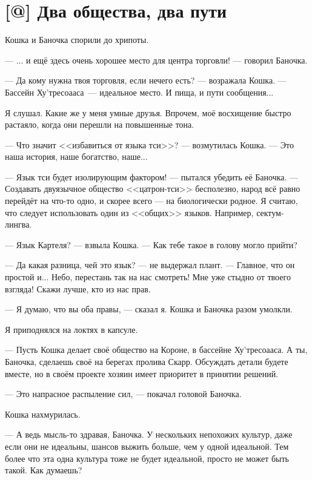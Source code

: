\section{[@] Два общества, два пути}

\textspace

Кошка и Баночка спорили до хрипоты.

--- ... и ещё здесь очень хорошее место для центра торговли! --- говорил Баночка.

--- Да кому нужна твоя торговля, если нечего есть? --- возражала Кошка.
--- Бассейн Ху'тресоааса\FM\ --- идеальное место.
И пища, и пути сообщения...

Я слушал.
Какие же у меня умные друзья.
Впрочем, моё восхищение быстро растаяло, когда они перешли на повышенные тона.

--- Что значит <<избавиться от языка тси>>? --- возмутилась Кошка.
--- Это наша история, наше богатство, наше...

--- Язык тси будет изолирующим фактором! --- пытался убедить её Баночка.
--- Создавать двуязычное общество <<цатрон-тси>> бесполезно, народ всё равно перейдёт на что-то одно, и скорее всего --- на биологически родное.
Я считаю, что следует использовать один из <<общих>> языков.
Например, сектум-лингва.

--- Язык Картеля? --- взвыла Кошка.
--- Как тебе такое в голову могло прийти?

--- Да какая разница, чей это язык? --- не выдержал плант.
--- Главное, что он простой и...
Небо, перестань так на нас смотреть!
Мне уже стыдно от твоего взгляда!
Скажи лучше, кто из нас прав.

--- Я думаю, что вы оба правы, --- сказал я.
Кошка и Баночка разом умолкли.

Я приподнялся на локтях в капсуле.

--- Пусть Кошка делает своё общество на Короне, в бассейне Ху'тресоааса.
А ты, Баночка, сделаешь своё на берегах пролива Скарр.
Обсуждать детали будете вместе, но в своём проекте хозяин имеет приоритет в принятии решений.

--- Это напрасное распыление сил, --- покачал головой Баночка.

Кошка нахмурилась.

--- А ведь мысль-то здравая, Баночка.
У нескольких непохожих культур, даже если они не идеальны, шансов выжить больше, чем у одной идеальной.
Тем более что эта одна культура тоже не будет идеальной, просто не может быть такой.
Как думаешь?

